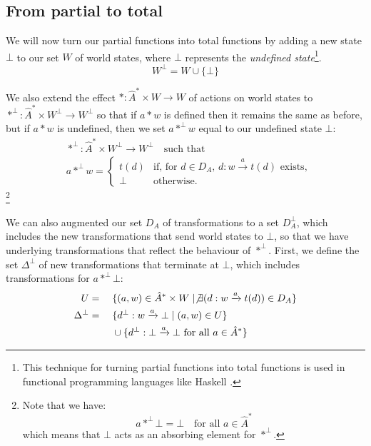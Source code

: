 \subsection{From partial to total}

We will now turn our partial functions into total functions by adding a new state $\bot$ to our set $W$ of world states, where $\bot$ represents the \emph{undefined state}\footnote{
	This technique for turning partial functions into total functions is used in functional programming languages like Haskell .
}.
\begin{equation}
	W^{\bot} = W \cup \{ \bot \}
\end{equation}

We also extend the effect $\ast : \hat{A}^{\ast} \times W \to W$ of actions on world states to $\ast^{\bot} : \hat{A}^{\ast} \times W^{\bot} \to  W^{\bot}$ so that if $a \ast w$ is defined then it remains the same as before, but if $a \ast w$ is undefined, then we set $a \ast^{\bot} w$ equal to our undefined state $\bot$:
\begin{align}
	 & \ast^{\bot} : \hat{A}^{\ast} \times W^{\bot} \to  W^{\bot} \quad\text{such that} \\
	 & a \ast^{\bot} w =
	\begin{cases}
		t(d) & \text{if, for $d \in D_{A}$, } d : w \xrightarrow{a} t(d) \text{ exists}, \\
		\bot & \text{otherwise.}
	\end{cases}
\end{align}
\footnote{
	Note that we have:
	\begin{equation}
		a \ast^{\bot} \bot = \bot \quad \text{for all $a \in \hat{A}^{\ast}$}
	\end{equation}
	which means that $\bot$ acts as an absorbing element for $\ast^{\bot}$.
}

We can also augmented our set $D_{A}$ of transformations to a set $D_{A}^{\bot}$, which includes the new transformations that send world states to $\bot$, so that we have underlying transformations that reflect the behaviour of $\ast^{\bot}$.
First, we define the set $\Delta^{\bot}$ of new transformations that terminate at $\bot$, which includes transformations for $a \ast^{\bot} \bot$:
\begin{alignat}{2}
	U             & {}={} &  & \{ (a,w) \in \hat{A}^{\ast} \times W \mid \not\exists (d: w \xrightarrow{a} t(d)) \in D_{A} \} \\
	\Delta^{\bot} & {}={} &  & \{ d^{\bot}: w \xrightarrow{a} \bot \mid (a, w) \in U \}                                       \\
	              &       &  & \cup \{ d^{\bot}: \bot \xrightarrow{a} \bot \text{ for all $a \in \hat{A}^{\ast}$} \}
\end{alignat}

